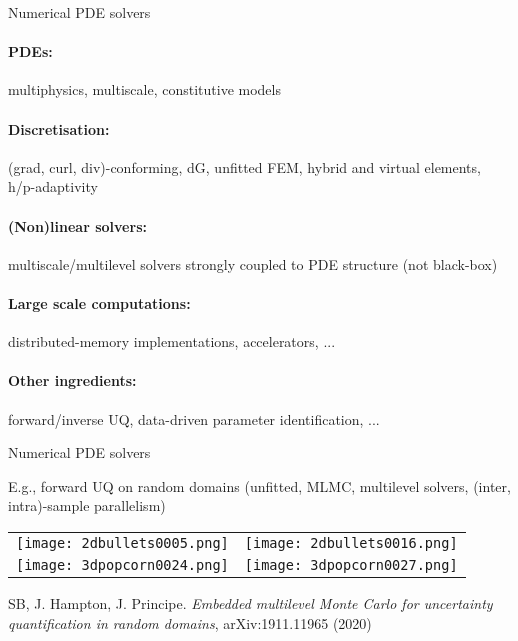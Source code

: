 
\begin{frame}{Numerical PDE solvers}

\paragraph{\textbf{PDEs:}} multiphysics, multiscale, constitutive models

\paragraph{\textbf{Discretisation:}} (grad, curl, div)-conforming, dG, unfitted FEM, hybrid and virtual elements, h/p-adaptivity

\paragraph{\textbf{(Non)linear solvers:}} multiscale/multilevel solvers strongly coupled to PDE structure (not black-box)

\paragraph{\textbf{Large scale computations:}} distributed-memory implementations, accelerators, ...

\paragraph{\textbf{Other ingredients:}} forward/inverse UQ, data-driven parameter identification, ...

\end{frame}

\begin{frame}{Numerical PDE solvers}

E.g., forward UQ on random domains (unfitted, MLMC, multilevel solvers, (inter, intra)-sample parallelism)

\begin{tabular}{cc}
  \texttt{[image: 2dbullets0005.png]} &
  \texttt{[image: 2dbullets0016.png]}  \\
  \texttt{[image: 3dpopcorn0024.png]} &
  \texttt{[image: 3dpopcorn0027.png]}
\end{tabular}

{\scriptsize

SB, J. Hampton, J. Principe. \emph{Embedded multilevel Monte Carlo for uncertainty quantification in random domains}, arXiv:1911.11965 (2020) }

\end{frame}

